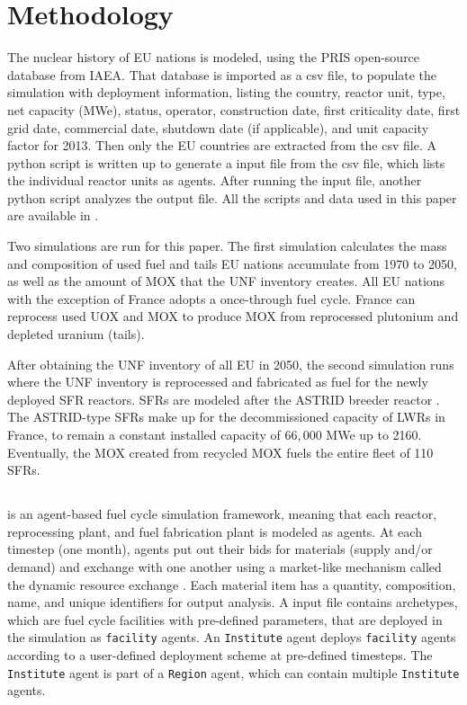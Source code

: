 \section{Methodology}
The nuclear history of EU nations is modeled, using the \gls{PRIS} open-source 
database from \gls{IAEA}. That database is imported as a csv file, to populate the simulation
with deployment information, listing the country, reactor unit, type, net capacity (MWe), status,
operator, construction date, first criticality date, first grid date, commercial date, shutdown
date (if applicable), and unit capacity factor for 2013. Then only the \gls{EU} countries are extracted
from the csv file. A python script is written up to generate a \Cyclus input file from the csv file,
which lists the individual reactor units as agents. After running the \Cyclus input file,
another python script analyzes the output file. All the scripts and data used
in this paper are available in \cite{bae_arfc/transition-scenarios:_2017}.

Two \Cyclus simulations are run for this paper. 
The first simulation calculates
the mass and composition of used fuel and tails \gls{EU} nations accumulate from 1970 to 2050,
as well as the amount of \gls{MOX} that the \gls{UNF} inventory creates.
All EU nations with the exception of France adopts a once-through fuel cycle.
France can reprocess used \gls{UOX} and \gls{MOX} to
produce \gls{MOX} from reprocessed plutonium and depleted uranium (tails).

After obtaining the \gls{UNF} inventory of all \gls{EU} in 2050, the second
simulation runs where the \gls{UNF} inventory is reprocessed and fabricated
as fuel for the newly deployed \gls{SFR} reactors.
\glspl{SFR} are modeled after the ASTRID breeder reactor \cite{varaine_pre-conceptual_2012}.
The ASTRID-type \glspl{SFR} make up for the decommissioned capacity
of \glspl{LWR} in France, to remain a constant installed capacity of $66,000$ MWe up to 2160.
Eventually, the  \gls{MOX} created from recycled \gls{MOX}
fuels the entire fleet of 110 \glspl{SFR}.

\subsection{\Cyclus}
\Cyclus is an agent-based fuel cycle simulation framework, meaning that
each reactor, reprocessing plant, and fuel fabrication plant is modeled as agents. At each timestep (one month),
agents put out their bids for materials (supply and/or demand) and exchange
with one another using a market-like mechanism called the 
dynamic resource exchange \cite{huff_fundamental_2016}.
Each material item has a quantity, composition, name, and unique identifiers
for output analysis. 
A \Cyclus input file contains archetypes, which are fuel cycle facilities with
pre-defined parameters, that are deployed in the simulation as \texttt{facility} agents.
An \texttt{Institute} agent deploys \texttt{facility} agents
according to a user-defined deployment scheme at pre-defined timesteps.
The \texttt{Institute} agent is part of a \texttt{Region} agent,
which can contain multiple \texttt{Institute} agents.

